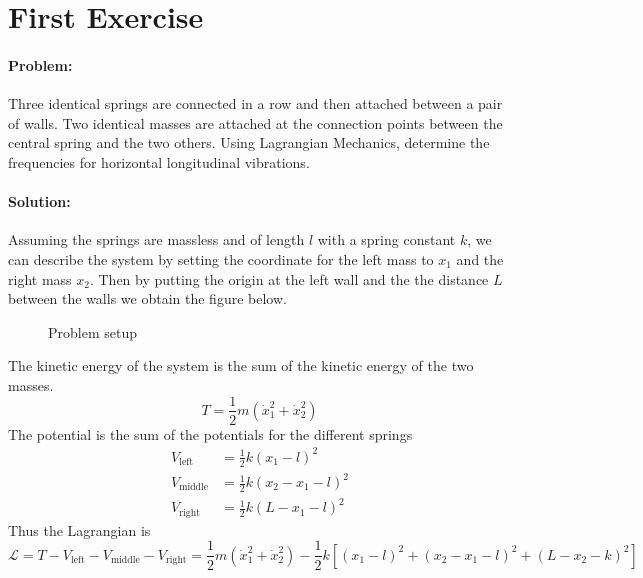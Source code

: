 \section{First Exercise}
\paragraph{Problem:} Three identical springs are connected in a row and then attached between a pair of walls. Two identical masses are attached at the connection points between the central spring and the two others. Using Lagrangian Mechanics, determine the frequencies for horizontal longitudinal vibrations.

\paragraph{Solution:} Assuming the springs are massless and of length $l$ with a spring constant $k$, we can describe the system by setting the coordinate for the left mass to $x_1$ and the right mass $x_2$. Then by putting the origin at the left wall and the the distance $L$ between the walls we obtain the figure below.

\begin{figure}[H]
    \centering
    
    \caption{Problem setup}
\end{figure}

The kinetic energy of the system is the sum of the kinetic energy of the two masses.
\begin{equation*}
    T = \frac{1}{2} m ( \dot{x}_1^2 + \dot{x}_2^2 )
\end{equation*}
The potential is the sum of the potentials for the different springs
\begin{align*}
    V_\mathrm{left} &= \frac{1}{2} k (x_1 - l)^2\\
    V_\mathrm{middle} &= \frac{1}{2} k (x_2 - x_1 - l)^2\\
    V_\mathrm{right} &= \frac{1}{2} k (L - x_1 - l)^2
\end{align*}
Thus the Lagrangian is 
\begin{equation*}
    \mathcal{L} = T - V_\mathrm{left} - V_\mathrm{middle} -V_\mathrm{right} = \frac{1}{2} m ( \dot{x}_1^2 + \dot{x}_2^2 ) - \frac{1}{2} k [ (x_1 - l)^2 + (x_2 - x_1 - l)^2 + (L - x_2 - k)^2  ]
\end{equation*}

